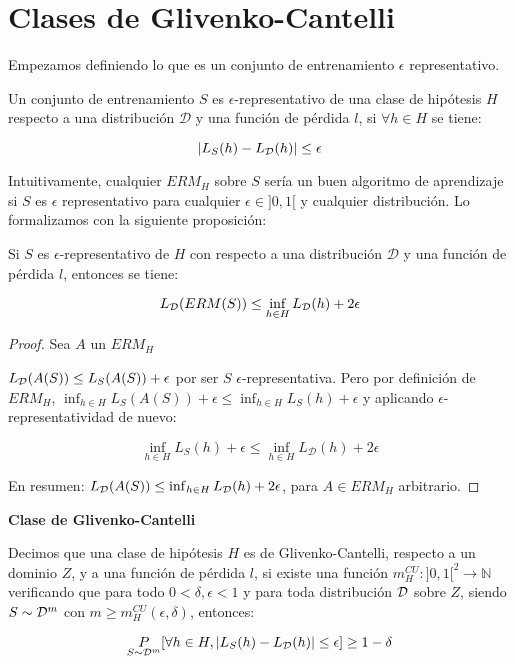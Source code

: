 \section{Clases de Glivenko-Cantelli}

Empezamos definiendo lo que es un conjunto de entrenamiento $\epsilon$ representativo.

\begin{definition*}
 Un conjunto de entrenamiento $S$ es $\epsilon$-representativo de una clase de hipótesis $H$ respecto a una
 distribución $\mathcal{D}$ y una función de pérdida $l$, si $\forall h\in H$ se tiene:
 
 \[|L_S(h) - L_{\mathcal{D}}(h)| \le \epsilon\]
\end{definition*}

Intuitivamente, cualquier $ERM_H$ sobre $S$ sería un buen algoritmo de aprendizaje 
si $S$ es $\epsilon$ representativo para cualquier $\epsilon \in ]0,1[$ y cualquier distribución. 
Lo formalizamos con la siguiente proposición:

\begin{fact}
 Si $S$ es $\epsilon$-representativo de $H$ con respecto a una distribución $\mathcal{D}$ y una función de 
 pérdida $l$, entonces se tiene:
 
 \[L_{\mathcal{D}}(ERM(S)) \le \inf_{h\in H} L_{\mathcal{D}}(h) + 2\epsilon\]
 
 \label{fact:epsilon-rep}
\end{fact}

\begin{proof}
 Sea $A$ un $ERM_H$
 
 $L_{\mathcal{D}}(A(S)) \le L_S(A(S)) + \epsilon$ por ser $S$ $\epsilon$-representativa. Pero por definición de 
 $ERM_H$, $\inf_{h\in H} L_S(A(S)) + \epsilon \le \inf_{h\in H}L_S(h) + \epsilon$ y aplicando $\epsilon$-representatividad de nuevo:
 
 \[\inf_{h\in H} L_S(h) + \epsilon \le \inf_{h\in H} L_{\mathcal{D}}(h) + 2\epsilon\]
 
 En resumen: $L_{\mathcal{D}}(A(S)) \le \inf_{h\in H} L_{\mathcal{D}}(h) + 2\epsilon$, para $A \in ERM_H$ arbitrario.
\end{proof}


\begin{definition*} \textbf{Clase de Glivenko-Cantelli}

Decimos que una clase de hipótesis $H$ es de Glivenko-Cantelli, respecto a un dominio $Z$, y a 
una función de pérdida $l$, si existe una función ${m_{H}^{CU}: ]0,1[^2 \rightarrow \mathbb{N}}$ 
verificando que para todo $0 < \delta, \epsilon < 1$ y para toda distribución $\mathcal{D}$ sobre $Z$, siendo 
$S\sim \mathcal{D}^m$ con $m \ge m_{H}^{CU}(\epsilon, \delta)$, 
entonces:

\[\underset{S\sim \mathcal{D}^m}{P} [\forall h\in H, |L_S(h) - L_{\mathcal{D}}(h)| \le \epsilon] \ge 1-\delta\]
\end{definition*}

